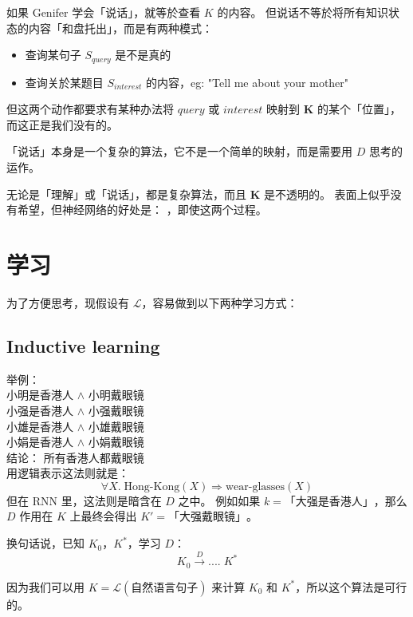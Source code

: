 \documentclass[12pt]{article}
\newcommand{\tab}{\hspace*{1cm}}
\begin{document}
如果 Genifer 学会「说话」，就等於查看 $K$ 的内容。 但说话不等於将所有知识状态的内容「和盘托出」，而是有两种模式：
\begin{itemize}
\item 查询某句子 $S_{query}$ 是不是真的
\item 查询关於某题目 $S_{interest}$ 的内容，eg: "Tell me about your mother"
\end{itemize}
但这两个动作都要求有某种办法将 $query$ 或 $interest$ 映射到 $\mathbf{K}$ 的某个「位置」，而这正是我们没有的。

「说话」本身是一个复杂的算法，它不是一个简单的映射，而是需要用 $D$ 思考的运作。

无论是「理解」或「说话」，都是复杂算法，而且 $\mathbf{K}$ 是不透明的。  表面上似乎没有希望，但神经网络的好处是： ，即使这两个过程。

\section{学习}

为了方便思考，现假设有 $\mathcal{L}$，容易做到以下两种学习方式：

\subsection{Inductive learning}

举例：\\
\tab 小明是香港人 $\wedge$ 小明戴眼镜 \\
\tab 小强是香港人 $\wedge$ 小强戴眼镜 \\
\tab 小雄是香港人 $\wedge$ 小雄戴眼镜 \\
\tab 小娟是香港人 $\wedge$ 小娟戴眼镜 \\
\tab 结论： 所有香港人都戴眼镜 \\
用逻辑表示这法则就是：
$$ \forall X. \; \mbox{Hong-Kong}(X) \Rightarrow \mbox{wear-glasses}(X) $$
但在 RNN 里，这法则是暗含在 $D$ 之中。 例如如果 $k = \mbox{「大强是香港人」}$，那么 $D$ 作用在 $K$ 上最终会得出 $K' = \mbox{「大强戴眼镜」}$。

换句话说，已知 $K_0$，$K^*$，学习 $D$：
$$ K_0 \stackrel{D}{\longrightarrow} .... \; K^* $$

因为我们可以用 $K = \mathcal{L}(\mbox{自然语言句子})$ 来计算 $K_0$ 和 $K^*$，所以这个算法是可行的。
\end{document}

